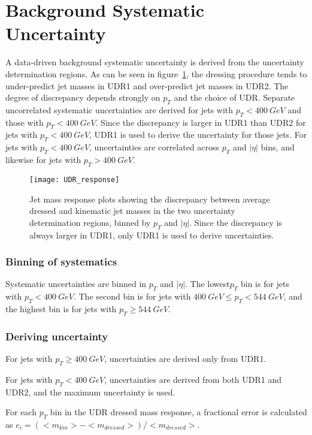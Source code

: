 \section{Background Systematic Uncertainty} \label{sec:bkg_uncert}
A data-driven background systematic uncertainty is derived from the uncertainty determination regions.
As can be seen in figure~\ref{fig:udr_response}, the dressing procedure tends to under-predict jet masses in UDR1 and over-predict jet masses in UDR2.
The degree of discrepancy depends strongly on $p_T$ and the choice of UDR.
Separate uncorrelated systematic uncertainties are derived for jets with $p_T<400~GeV$ and those with $p_T<400~GeV$.
Since the discrepancy is larger in UDR1 than UDR2 for jets with $p_T<400~GeV$, UDR1 is used to derive the uncertainty for those jets.
For jets with $p_T<400~GeV$, uncertainties are correlated across $p_T$ and $|\eta|$ bins, and likewise for jets with $p_T>400~GeV$.

\begin{figure}[!ht]
    \texttt{[image: UDR\_response]}
    \caption{Jet mass response plots showing the discrepancy between average dressed and kinematic jet masses in the two uncertainty
    determination regions, binned by $p_T$ and $|\eta|$.
    Since the discrepancy is always larger in UDR1, only UDR1 is used to derive uncertainties.}
    \label{fig:udr_response}
\end{figure}

\subsubsection{Binning of systematics}
Systematic uncertainties are binned in $p_{T}$ and $|\eta|$.
The lowest$p_{T}$ bin is for jets with $p_{T} < 400~GeV$.
The second bin is for jets with $400~GeV \leq p_T < 544~GeV$, and the highest bin is for jets with $p_T \geq 544~GeV$.

\subsubsection{Deriving uncertainty}
For jets with $p_{T} \geq 400~GeV$, uncertainties are derived only from UDR1.

For jets with $p_{T} < 400~GeV$, uncertainties are derived from both UDR1 and UDR2, and the maximum uncertainty is used.

For each $p_T$ bin in the UDR dressed mass response, a fractional error is calculated as $e_i=\left(<m_{kin}>-<m_{dressed}>\right)/<m_{dressed}>$.

